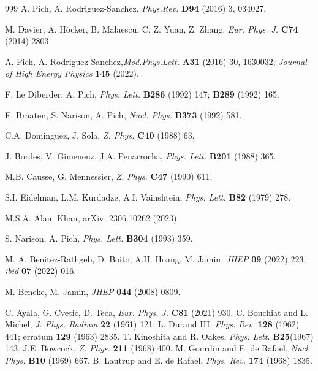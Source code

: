 \begin{thebibliography}{999}
 A. Pich, A. Rodriguez-Sanchez, {\it Phys.Rev.} {\bf D94} (2016) 3, 034027.


 M. Davier, A. H\"ocker, B. Malaescu, C. Z. Yuan, Z. Zhang, {\it Eur. Phys. J.} {\bf C74} (2014) 2803.

 A. Pich, A. Rodriguez-Sanchez,{\it Mod.Phys.Lett.} {\bf A31} (2016) 30, 1630032; {\it Journal of High Energy Physics} {\bf  145} (2022).

 F. Le Diberder,  A. Pich, {\it Phys. Lett.} {\bf B286} (1992) 147; {\bf B289} 
(1992) 165.

E. Braaten, S. Narison, A. Pich, {\it Nucl. Phys.} {\bf B373} (1992) 581.


 C.A. Dominguez, J. Sola, {\it  Z. Phys.} {\bf C40} (1988) 63.

 J. Bordes, V. Gimenenz, J.A. Penarrocha, {\it Phys. Lett.} {\bf B201} (1988) 365.

 M.B. Causse, G. Mennessier, {\it  Z. Phys.} {\bf C47} (1990) 611.

 S.I. Eidelman, L.M. Kurdadze, A.I. Vainshtein,  {\it Phys. Lett.} {\bf B82} (1979) 278.

 M.S.A. Alam Khan, arXiv: 2306.10262 (2023).

  S. Narison,  A. Pich, {\it Phys. Lett.} {\bf B304} (1993) 359.
 
  M. A. Benitez-Rathgeb, D. Boito,  A.H. Hoang, M. Jamin, {\it JHEP} {\bf 09} (2022) 223;
 {\it ibid} {\bf 07} (2022) 016.
 
  M. Beneke, M. Jamin, {\it JHEP} {\bf 044} (2008) 0809.
  
  C. Ayala, G. Cvetic, D. Teca, {\it Eur. Phys. J.} {\bf C81}  (2021) 930.
 C. Bouchiat and L. Michel, {\it J. Phys. Radium} {\bf 22}
(1961) 121.
 L. Durand III, {\it Phys. Rev.} {\bf 128} (1962) 441; erratum {\bf 129} (1963) 2835.
T. Kinoshita and R. Oakes, {\it Phys. Lett.} {\bf B25}(1967) 143.
J.E. Bowcock, {\it Z. Phys.} {\bf 211} (1968) 400.
M. Gourdin and E. de Rafael, {\it Nucl. Phys.} {\bf B10} (1969) 667.
B. Lautrup and E. de Rafael, {\it Phys. Rev.} {\bf 174} (1968) 1835.


\end{thebibliography}
